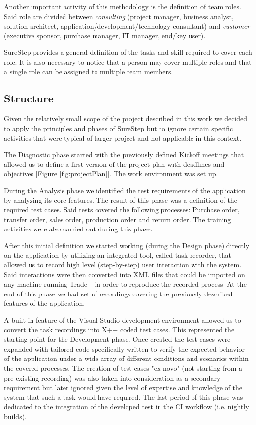 Another important activity of this methodology is the definition of team roles. Said role are divided between \textit{consulting} (project manager, business analyst, solution architect, application/development/technology consultant) and \textit{customer} (executive sponsor, purchase manager, IT manager, end/key user).

SureStep provides a general definition of the tasks and skill required to cover each role. It is also necessary to notice that a person may cover multiple roles and that a single role can be assigned to multiple team members. 

\subsection{Structure}

Given the relatively small scope of the project described in this work we decided to apply the principles and phases of SureStep but to ignore certain specific activities that were typical of larger project and not applicable in this context.

The Diagnostic phase started with the previously defined Kickoff meetings that allowed us to define a first version of the project plan with deadlines and objectives [Figure \ref{fig:projectPlan}]. The work environment was set up.

During the Analysis phase we identified the test requirements of the application by analyzing its core features. The result of this phase was a definition of the required test cases. Said tests covered the following processes: Purchase order, transfer order, sales order, production order and return order. The training activities were also carried out during this phase.

After this initial definition we started working (during the Design phase) directly on the application by utilizing an integrated tool, called task recorder, that allowed us to record high level (step-by-step) user interaction with the system. Said interactions were then converted into XML files that could be imported on any machine running Trade+ in order to reproduce the recorded process. At the end of this phase we had set of recordings covering the previously described features of the application.

A built-in feature of the Visual Studio development environment allowed us to convert the task recordings into X++ coded test cases. This represented the starting point for the Development phase. Once created the test cases were expanded with tailored code specifically written to verify the expected behavior of the application under a wide array of different conditions and scenarios within the covered processes. The creation of test cases "ex novo" (not starting from a pre-existing recording) was also taken into consideration as a secondary requirement but later ignored given the level of expertise and knowledge of the system that such a task would have required. The last period of this phase was dedicated to the integration of the developed test in the CI workflow (i.e. nightly builds).

